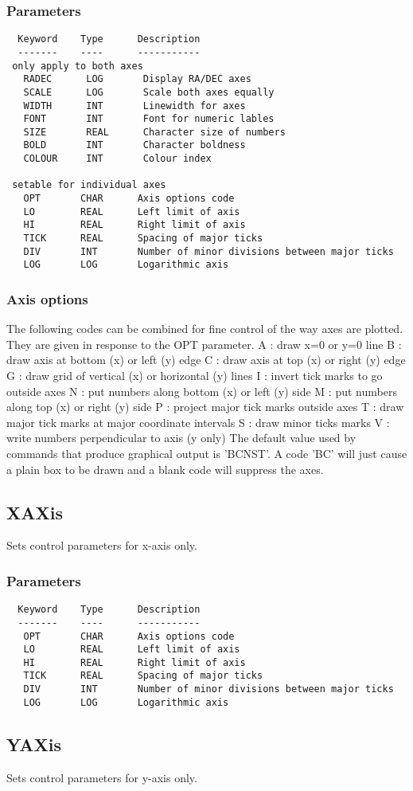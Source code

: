 \documentclass{book}
\renewcommand{\_}{{\tt\char'137}}     %
\begin{document}
\subsubsection{Parameters}
\begin{verbatim}
  Keyword    Type      Description
  -------    ----      -----------
 only apply to both axes
   RADEC      LOG       Display RA/DEC axes
   SCALE      LOG       Scale both axes equally
   WIDTH      INT       Linewidth for axes
   FONT       INT       Font for numeric lables
   SIZE       REAL      Character size of numbers
   BOLD       INT       Character boldness
   COLOUR     INT       Colour index
 
 setable for individual axes
   OPT       CHAR      Axis options code
   LO        REAL      Left limit of axis
   HI        REAL      Right limit of axis
   TICK      REAL      Spacing of major ticks
   DIV       INT       Number of minor divisions between major ticks
   LOG       LOG       Logarithmic axis
\end{verbatim}\subsubsection{Axis options}
The following codes can be combined for fine control of the way
axes are plotted. They are given in response to the OPT parameter.
A : draw x=0 or y=0 line
B : draw axis at bottom (x) or left (y) edge
C : draw axis at top (x) or right (y) edge
G : draw grid of vertical (x) or horizontal (y) lines
I : invert tick marks to go outside axes
N : put numbers along bottom (x) or left (y) side
M : put numbers along top (x) or right (y) side
P : project major tick marks outside axes
T : draw major tick marks at major coordinate intervals
S : draw minor ticks marks
V : write numbers perpendicular to axis (y only)
The default value used by commands that produce graphical output
is 'BCNST'. A code 'BC' will just cause a plain box to be drawn
and a blank code will suppress the axes.
 
\subsection{XAXis}
Sets control parameters for x-axis only.
 
\subsubsection{Parameters}
\begin{verbatim}
  Keyword    Type      Description
  -------    ----      -----------
   OPT       CHAR      Axis options code
   LO        REAL      Left limit of axis
   HI        REAL      Right limit of axis
   TICK      REAL      Spacing of major ticks
   DIV       INT       Number of minor divisions between major ticks
   LOG       LOG       Logarithmic axis
\end{verbatim}\subsection{YAXis}
Sets control parameters for y-axis only.
 
\end{document}
